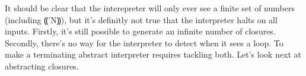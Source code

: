 It should be clear that the interepreter will only ever see a finite
set of numbers (including ⸨'N⸩), but it's definitly not true
that the interpreter halts on all inputs.  Firstly, it's still
possible to generate an infinite number of closures.  Secondly,
there's no way for the interpreter to detect when it sees a loop.  To
make a terminating abstract interpreter requires tackling both.  Let's
look next at abstracting closures.

